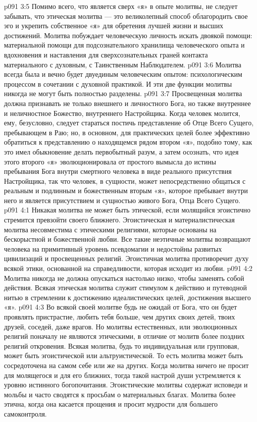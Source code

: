 \vs p091 3:5 Помимо всего, что является сверх «я» в опыте молитвы, не следует забывать, что этическая молитва --- это великолепный способ облагородить свое эго и укрепить собственное «я» для обретения лучшей жизни и высших достижений. Молитва побуждает человеческую личность искать двоякой помощи: материальной помощи для подсознательного хранилища человеческого опыта и вдохновения и наставления для сверхсознательных граней контакта материального с духовным, с Таинственным Наблюдателем.
\vs p091 3:6 Молитва всегда была и вечно будет двуединым человеческим опытом: психологическим процессом в сочетании с духовной практикой. И эти две функции молитвы никогда не могут быть полностью разделены.
\vs p091 3:7 Просвещенная молитва должна признавать не только внешнего и личностного Бога, но также внутреннее и неличностное Божество, внутреннего Настройщика. Когда человек молится, ему, безусловно, следует стараться постичь представление об Отце Всего Сущего, пребывающем в Раю; но, в основном, для практических целей более эффективно обратиться к представлению о находящемся рядом втором «я», подобно тому, как это имел обыкновение делать первобытный разум, а затем осознать, что идея этого второго «я» эволюционировала от простого вымысла до истины пребывания Бога внутри смертного человека в виде реального присутствия Настройщика, так что человек, в сущности, может непосредственно общаться с реальным и подлинным и божественным вторым «я», которое пребывает внутри него и является присутствием и сущностью живого Бога, Отца Всего Сущего.
\vs p091 4:1 Никакая молитва не может быть этической, если молящийся эгоистично стремится превзойти своего ближнего. Эгоистическая и материалистическая молитва несовместима с этическими религиями, которые основаны на бескорыстной и божественной любви. Все такие неэтичные молитвы возвращают человека на примитивный уровень псевдомагии и недостойны развитых цивилизаций и просвещенных религий. Эгоистичная молитва противоречит духу всякой этики, основанной на справедливости, которая исходит из любви.
\vs p091 4:2 Молитва никогда не должна опускаться настолько низко, чтобы заменять собой действия. Всякая этическая молитва служит стимулом к действию и путеводной нитью в стремлении к достижению идеалистических целей, достижения высшего «я».
\vs p091 4:3 Во всякой своей молитве будь  не ожидай от Бога, что он будет проявлять пристрастие, любить тебя больше, чем других своих детей, твоих друзей, соседей, даже врагов. Но молитвы естественных, или эволюционных религий поначалу не являются этическими, в отличие от молитв более поздних религий откровения. Всякая молитва, будь то индивидуальная или групповая, может быть эгоистической или альтруистической. То есть молитва может быть сосредоточена на самом себе или же на других. Когда молитва ничего не просит для молящегося и для его ближних, тогда такой настрой души устремляется к уровню истинного богопочитания. Эгоистические молитвы содержат исповеди и мольбы и часто сводятся к просьбам о материальных благах. Молитва более этична, когда она касается прощения и просит мудрости для большего самоконтроля.
